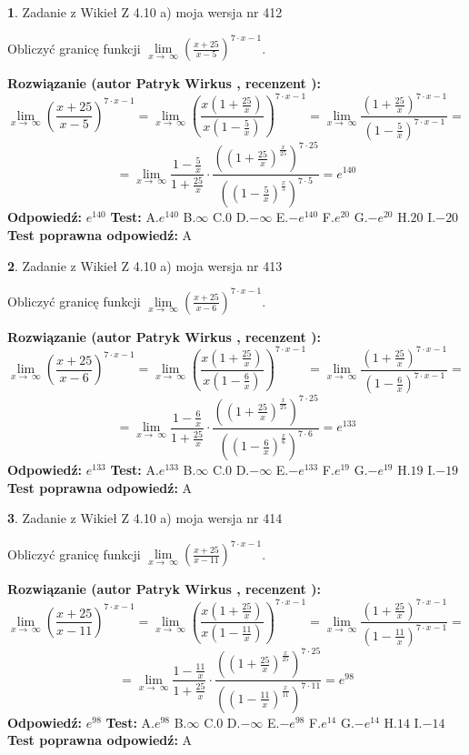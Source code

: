 \documentclass[12pt, a4paper]{article}
\theoremstyle{definition} %
\newtheorem{zad}{}
\newcommand{\zadStart}[1]{\begin{zad}#1\newline}
\newcommand{\zadStop}{\end{zad}}
\newcommand{\rozwStart}[2]{\noindent \textbf{Rozwiązanie (autor #1 , recenzent #2): }\newline}
\newcommand{\rozwStop}{\newline}
\newcommand{\odpStart}{\noindent \textbf{Odpowiedź:}\newline}
\newcommand{\odpStop}{\newline}
\newcommand{\testStart}{\noindent \textbf{Test:}\newline}
\newcommand{\testStop}{\newline}
\newcommand{\kluczStart}{\noindent \textbf{Test poprawna odpowiedź:}\newline}
\newcommand{\kluczStop}{\newline}
\begin{document}
\zadStart{Zadanie z Wikieł Z 4.10 a) moja wersja nr 412}

Obliczyć granicę funkcji  $\lim\limits_{x\to\ \infty}(\frac{x+25}{x-5})^{7\cdot x-1}$.
\zadStop
\rozwStart{Patryk Wirkus}{}
$$\lim\limits_{x\to\ \infty}(\frac{x+25}{x-5})^{7\cdot x-1} = \lim\limits_{x\to\ \infty}(\frac{x(1+\frac{25}{x})}{x(1-\frac{5}{x})})^{7\cdot x-1}=\lim\limits_{x\to\ \infty}\frac{(1+\frac{25}{x})^{7\cdot x-1}}{(1-\frac{5}{x})^{7\cdot x-1}}=$$
$$=\lim\limits_{x\to\ \infty}\frac{1-\frac{5}{x}}{1+\frac{25}{x}}\cdot\frac{((1+\frac{25}{x})^{\frac{x}{25}})^{7\cdot25}}{((1-\frac{5}{x})^{\frac{x}{5}})^{7\cdot5}}=e^{140}$$
\rozwStop
\odpStart
$e^{140}$
\odpStop
\testStart
A.$e^{140}$ B.$\infty$ C.$0$ D.$-\infty$ E.$-e^{140}$
F.$e^{20}$ G.$-e^{20}$
H.$20$
I.$-20$
\testStop
\kluczStart
A
\kluczStop



\zadStart{Zadanie z Wikieł Z 4.10 a) moja wersja nr 413}

Obliczyć granicę funkcji  $\lim\limits_{x\to\ \infty}(\frac{x+25}{x-6})^{7\cdot x-1}$.
\zadStop
\rozwStart{Patryk Wirkus}{}
$$\lim\limits_{x\to\ \infty}(\frac{x+25}{x-6})^{7\cdot x-1} = \lim\limits_{x\to\ \infty}(\frac{x(1+\frac{25}{x})}{x(1-\frac{6}{x})})^{7\cdot x-1}=\lim\limits_{x\to\ \infty}\frac{(1+\frac{25}{x})^{7\cdot x-1}}{(1-\frac{6}{x})^{7\cdot x-1}}=$$
$$=\lim\limits_{x\to\ \infty}\frac{1-\frac{6}{x}}{1+\frac{25}{x}}\cdot\frac{((1+\frac{25}{x})^{\frac{x}{25}})^{7\cdot25}}{((1-\frac{6}{x})^{\frac{x}{6}})^{7\cdot6}}=e^{133}$$
\rozwStop
\odpStart
$e^{133}$
\odpStop
\testStart
A.$e^{133}$ B.$\infty$ C.$0$ D.$-\infty$ E.$-e^{133}$
F.$e^{19}$ G.$-e^{19}$
H.$19$
I.$-19$
\testStop
\kluczStart
A
\kluczStop



\zadStart{Zadanie z Wikieł Z 4.10 a) moja wersja nr 414}

Obliczyć granicę funkcji  $\lim\limits_{x\to\ \infty}(\frac{x+25}{x-11})^{7\cdot x-1}$.
\zadStop
\rozwStart{Patryk Wirkus}{}
$$\lim\limits_{x\to\ \infty}(\frac{x+25}{x-11})^{7\cdot x-1} = \lim\limits_{x\to\ \infty}(\frac{x(1+\frac{25}{x})}{x(1-\frac{11}{x})})^{7\cdot x-1}=\lim\limits_{x\to\ \infty}\frac{(1+\frac{25}{x})^{7\cdot x-1}}{(1-\frac{11}{x})^{7\cdot x-1}}=$$
$$=\lim\limits_{x\to\ \infty}\frac{1-\frac{11}{x}}{1+\frac{25}{x}}\cdot\frac{((1+\frac{25}{x})^{\frac{x}{25}})^{7\cdot25}}{((1-\frac{11}{x})^{\frac{x}{11}})^{7\cdot11}}=e^{98}$$
\rozwStop
\odpStart
$e^{98}$
\odpStop
\testStart
A.$e^{98}$ B.$\infty$ C.$0$ D.$-\infty$ E.$-e^{98}$
F.$e^{14}$ G.$-e^{14}$
H.$14$
I.$-14$
\testStop
\kluczStart
A
\kluczStop
\end{document}
